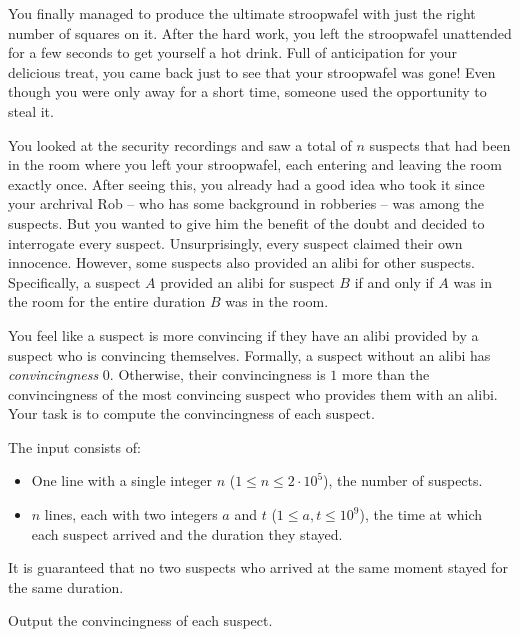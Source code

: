 
%
You finally managed to produce the ultimate stroopwafel with just the right
number of squares on it.  After the hard work, you left the stroopwafel
unattended for a few seconds to get yourself a hot drink.  Full of anticipation
for your delicious treat, you came back just to see that your stroopwafel was
gone!  Even though you were only away for a short time, someone used the
opportunity to steal it.

You looked at the security recordings and saw a total of $n$ suspects that had been
in the room where you left your stroopwafel, each entering and leaving the room
exactly once.  After seeing this, you already had a
good idea who took it since your archrival Rob -- who has some background in
robberies -- was among the suspects.  But you wanted to give him the benefit of
the doubt and decided to interrogate every suspect.  Unsurprisingly, every
suspect claimed their own innocence.  However, some suspects also
provided an alibi for other suspects.  Specifically, a suspect $A$ provided an
alibi for suspect $B$ if and only if $A$ was in the room for the entire duration
$B$ was in the room.

You feel like a suspect is more convincing if they have an alibi provided by a suspect
who is convincing themselves.  Formally, a suspect without an alibi has
\emph{convincingness} $0$. Otherwise, their convincingness is $1$ more than
the convincingness of the most convincing suspect who provides them with an alibi.
Your task is to compute the convincingness of each suspect.

\begin{Input}
\begin{minipage}{\textwidth}
  The input consists of:
  \vspace{0.5em}

  \begin{itemize}
    \item One line with a single integer $n$ ($1\leq n\leq 2\cdot 10^5$), the number of suspects.
    \vspace{0.5em}
    \item $n$ lines, each with two integers $a$ and $t$ ($1\leq a,t\leq 10^9$), the time at which each suspect arrived and the duration they stayed.
  \end{itemize}
  \vspace{0.5em}

  It is guaranteed that no two suspects who arrived at the same moment stayed
  for the same duration.
\end{minipage}
\end{Input}

\begin{Output}
  Output the convincingness of each suspect.
\end{Output}
